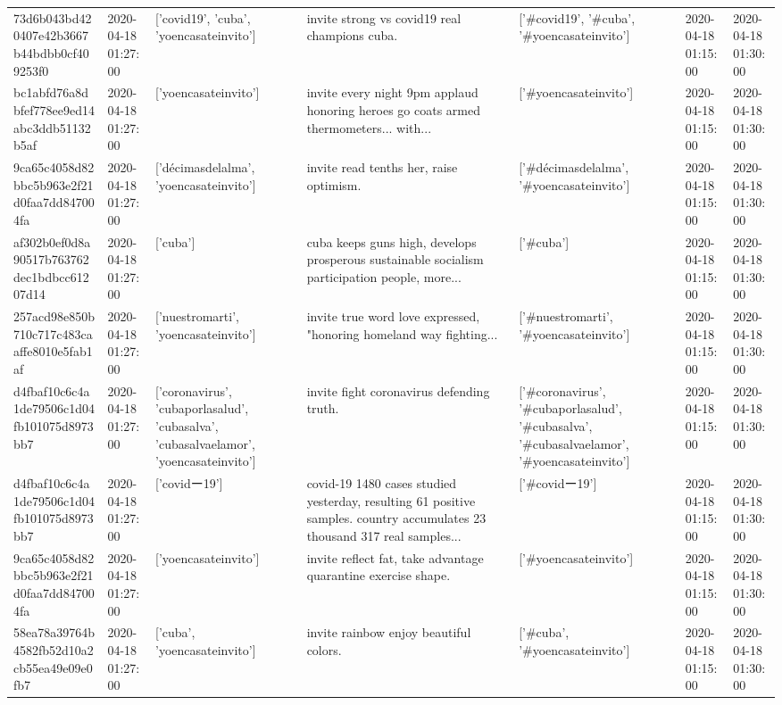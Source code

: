 \begin{tabular}{lllllll}
73d6b043bd420407e42b3667b44bdbb0cf409253f0 & 2020-04-18 01:27:00 & ['covid19', 'cuba', 'yoencasateinvito'] & invite strong vs covid19 real champions cuba. & ['#covid19', '#cuba', '#yoencasateinvito'] & 2020-04-18 01:15:00 & 2020-04-18 01:30:00 \\
bc1abfd76a8dbfef778ee9ed14abc3ddb51132b5af & 2020-04-18 01:27:00 & ['yoencasateinvito'] & invite every night 9pm applaud honoring heroes go coats armed thermometers... with... & ['#yoencasateinvito'] & 2020-04-18 01:15:00 & 2020-04-18 01:30:00 \\
9ca65c4058d82bbc5b963e2f21d0faa7dd847004fa & 2020-04-18 01:27:00 & ['décimasdelalma', 'yoencasateinvito'] & invite read tenths her, raise optimism. & ['#décimasdelalma', '#yoencasateinvito'] & 2020-04-18 01:15:00 & 2020-04-18 01:30:00 \\
af302b0ef0d8a90517b763762dec1bdbcc61207d14 & 2020-04-18 01:27:00 & ['cuba'] & cuba keeps guns high, develops prosperous sustainable socialism participation people, more... & ['#cuba'] & 2020-04-18 01:15:00 & 2020-04-18 01:30:00 \\
257acd98e850b710c717c483caaffe8010e5fab1af & 2020-04-18 01:27:00 & ['nuestromarti', 'yoencasateinvito'] & invite true word love expressed, "honoring homeland way fighting... & ['#nuestromarti', '#yoencasateinvito'] & 2020-04-18 01:15:00 & 2020-04-18 01:30:00 \\
d4fbaf10c6c4a1de79506c1d04fb101075d8973bb7 & 2020-04-18 01:27:00 & ['coronavirus', 'cubaporlasalud', 'cubasalva', 'cubasalvaelamor', 'yoencasateinvito'] & invite fight coronavirus defending truth. & ['#coronavirus', '#cubaporlasalud', '#cubasalva', '#cubasalvaelamor', '#yoencasateinvito'] & 2020-04-18 01:15:00 & 2020-04-18 01:30:00 \\
d4fbaf10c6c4a1de79506c1d04fb101075d8973bb7 & 2020-04-18 01:27:00 & ['covidー19'] & covid-19 1480 cases studied yesterday, resulting 61 positive samples. country accumulates 23 thousand 317 real samples... & ['#covidー19'] & 2020-04-18 01:15:00 & 2020-04-18 01:30:00 \\
9ca65c4058d82bbc5b963e2f21d0faa7dd847004fa & 2020-04-18 01:27:00 & ['yoencasateinvito'] & invite reflect fat, take advantage quarantine exercise shape. & ['#yoencasateinvito'] & 2020-04-18 01:15:00 & 2020-04-18 01:30:00 \\
58ea78a39764b4582fb52d10a2cb55ea49e09e0fb7 & 2020-04-18 01:27:00 & ['cuba', 'yoencasateinvito'] & invite rainbow enjoy beautiful colors. & ['#cuba', '#yoencasateinvito'] & 2020-04-18 01:15:00 & 2020-04-18 01:30:00 \\

\end{tabular}
